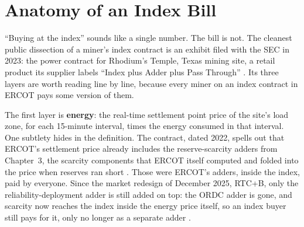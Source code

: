 \section{Anatomy of an Index Bill}
\label{sec:indexbill}

``Buying at the index'' sounds like a single number. The bill is not. The cleanest public dissection of a miner's index contract is an exhibit filed with the SEC in 2023: the power contract for Rhodium's Temple, Texas mining site, a retail product its supplier labels ``Index plus Adder plus Pass Through'' \autocite{rhodium2022indexcontract}. %
Its three layers are worth reading line by line, because every miner on an index contract in ERCOT pays some version of them.

The first layer is \textbf{energy}: the real-time settlement point price of the site's load zone, for each 15-minute interval, times the energy consumed in that interval. %
One subtlety hides in the definition. The contract, dated 2022, spells out that ERCOT's settlement price already includes the reserve-scarcity adders from Chapter~3, the scarcity components that ERCOT itself computed and folded into the price when reserves ran short \autocite{rhodium2022indexcontract}. %
Those were ERCOT's adders, inside the index, paid by everyone. Since the market redesign of December 2025, RTC+B, only the reliability-deployment adder is still added on top: the ORDC adder is gone, and scarcity now reaches the index inside the energy price itself, so an index buyer still pays for it, only no longer as a separate adder \autocite{ercot2026protocols,potomac2026somercot}. %

